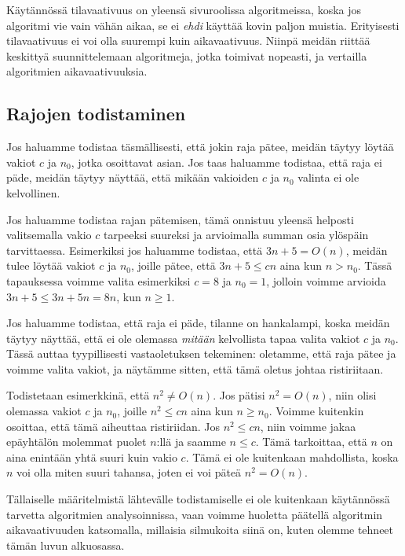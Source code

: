 Käytännössä tilavaativuus on yleensä sivuroolissa algoritmeissa,
koska jos algoritmi vie vain vähän aikaa, se ei \emph{ehdi} käyttää kovin paljon muistia.
Erityisesti tilavaativuus ei voi olla suurempi kuin aikavaativuus.
Niinpä meidän riittää keskittyä suunnittelemaan algoritmeja,
jotka toimivat nopeasti, ja vertailla algoritmien aikavaativuuksia.

\subsection{Rajojen todistaminen}

Jos haluamme todistaa täsmällisesti, että jokin raja pätee,
meidän täytyy löytää vakiot $c$ ja $n_0$, jotka osoittavat asian.
Jos taas haluamme todistaa, että raja ei päde,
meidän täytyy näyttää, että mikään vakioiden $c$ ja $n_0$ valinta ei ole kelvollinen.

Jos haluamme todistaa rajan pätemisen,
tämä onnistuu yleensä helposti valitsemalla vakio $c$
tarpeeksi suureksi ja arvioimalla summan osia ylöspäin tarvittaessa.
Esimerkiksi jos haluamme todistaa, että $3n+5 = O(n)$, meidän tulee löytää
vakiot $c$ ja $n_0$, joille pätee, että $3n+5 \le cn$ aina kun $n>n_0$.
Tässä tapauksessa voimme valita esimerkiksi $c=8$ ja $n_0=1$,
jolloin voimme arvioida $3n+5 \le 3n+5n=8n$, kun $n \ge 1$.

Jos haluamme todistaa, että raja ei päde, tilanne on hankalampi,
koska meidän täytyy näyttää, että ei ole olemassa \emph{mitään} kelvollista
tapaa valita vakiot $c$ ja $n_0$.
Tässä auttaa tyypillisesti vastaoletuksen tekeminen: oletamme,
että raja pätee ja voimme valita vakiot,
ja näytämme sitten, että tämä oletus johtaa ristiriitaan.

Todistetaan esimerkkinä, että $n^2 \neq O(n)$.
Jos pätisi $n^2=O(n)$, niin olisi olemassa vakiot $c$ ja $n_0$,
joille $n^2 \le cn$ aina kun $n \ge n_0$.
Voimme kuitenkin osoittaa, että tämä aiheuttaa ristiriidan.
Jos $n^2 \le cn$, niin voimme jakaa epäyhtälön molemmat puolet $n$:llä
ja saamme $n \le c$.
Tämä tarkoittaa, että $n$ on aina enintään yhtä suuri kuin vakio $c$.
Tämä ei ole kuitenkaan mahdollista, koska $n$ voi olla miten
suuri tahansa, joten ei voi päteä $n^2 = O(n)$.

Tällaiselle määritelmistä lähtevälle todistamiselle ei ole kuitenkaan
käy\-tännössä tarvetta algoritmien analysoinnissa,
vaan voimme huoletta päätellä algoritmin aikavaativuuden
katsomalla, millaisia silmukoita siinä on, kuten olemme tehneet tämän luvun alkuosassa.